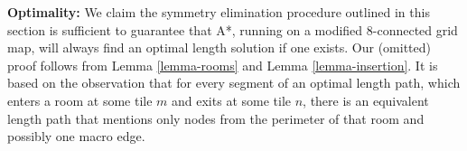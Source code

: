 \par \noindent
\newline
\textbf{Optimality:} We claim the symmetry elimination procedure outlined in this section is sufficient to guarantee
that A*, running on a modified 8-connected grid map, will always find an optimal length solution if one exists.
Our (omitted) proof follows from Lemma \ref{lemma-rooms} and Lemma \ref{lemma-insertion}.
It is based on the observation that for every segment of an optimal length path, which enters a room at some tile $m$
and exits at some tile $n$, there is an equivalent length path that mentions only nodes from the perimeter of that room 
and possibly one macro edge.
